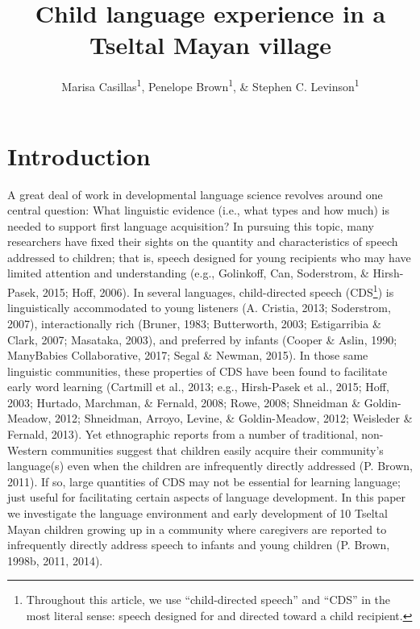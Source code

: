 \documentclass[floatsintext,man]{apa6}
\title{Child language experience in a Tseltal Mayan village}
\author{Marisa Casillas\textsuperscript{1}, Penelope Brown\textsuperscript{1}, \& Stephen C. Levinson\textsuperscript{1}}
\affiliation{
    \vspace{0.5cm}
          \textsuperscript{1} Max Planck Institute for Psycholinguistics  }
\theoremstyle{definition}
\theoremstyle{definition}
\theoremstyle{definition}
\theoremstyle{remark}
\begin{document}
\maketitle

\setcounter{secnumdepth}{0}



\section{Introduction}\label{intro}

A great deal of work in developmental language science revolves around
one central question: What linguistic evidence (i.e., what types and how
much) is needed to support first language acquisition? In pursuing this
topic, many researchers have fixed their sights on the quantity and
characteristics of speech addressed to children; that is, speech
designed for young recipients who may have limited attention and
understanding (e.g., Golinkoff, Can, Soderstrom, \& Hirsh-Pasek, 2015;
Hoff, 2006). In several languages, child-directed speech (CDS\footnote{Throughout
  this article, we use \enquote{child-directed speech} and \enquote{CDS}
  in the most literal sense: speech designed for and directed toward a
  child recipient.}) is linguistically accommodated to young listeners
(A. Cristia, 2013; Soderstrom, 2007), interactionally rich (Bruner,
1983; Butterworth, 2003; Estigarribia \& Clark, 2007; Masataka, 2003),
and preferred by infants (Cooper \& Aslin, 1990; ManyBabies
Collaborative, 2017; Segal \& Newman, 2015). In those same linguistic
communities, these properties of CDS have been found to facilitate early
word learning (Cartmill et al., 2013; e.g., Hirsh-Pasek et al., 2015;
Hoff, 2003; Hurtado, Marchman, \& Fernald, 2008; Rowe, 2008; Shneidman
\& Goldin-Meadow, 2012; Shneidman, Arroyo, Levine, \& Goldin-Meadow,
2012; Weisleder \& Fernald, 2013). Yet ethnographic reports from a
number of traditional, non-Western communities suggest that children
easily acquire their community's language(s) even when the children are
infrequently directly addressed (P. Brown, 2011). If so, large
quantities of CDS may not be essential for learning language; just
useful for facilitating certain aspects of language development. In this
paper we investigate the language environment and early development of
10 Tseltal Mayan children growing up in a community where caregivers are
reported to infrequently directly address speech to infants and young
children (P. Brown, 1998b, 2011, 2014).
\end{document}

